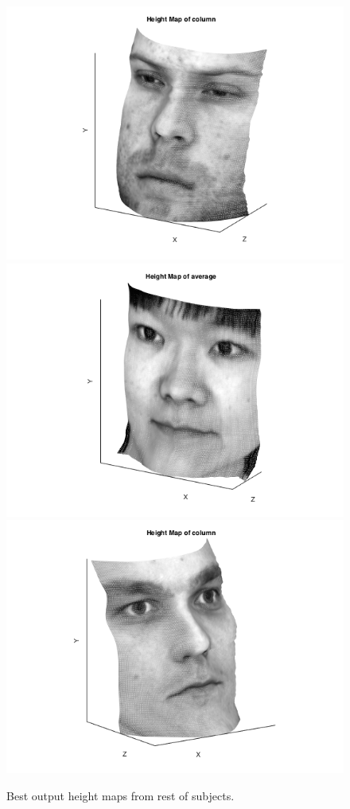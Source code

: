 \documentclass[a4paper]{article}
\begin{document}
\begin{figure}[h!]
  \includegraphics[width=\linewidth]{imgs/1col.png}
\endminipage\hfill
{}
  \includegraphics[width=\linewidth]{imgs/5aver.png}
\endminipage\hfill
{}%
  \includegraphics[width=\linewidth]{imgs/7col.png}
\endminipage
\caption{\label{fig:addi} Best output height maps from rest of subjects.}
\end{figure}
\end{document}
